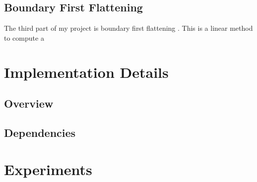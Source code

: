 \documentclass[fleqn,10pt]{wlscirep}
\begin{document}
\subsection{Boundary First Flattening}
The third part of my project is boundary first flattening \cite{1704.06873}. This is a linear method to compute a 






\section{Implementation Details}
\subsection{Overview}
\subsection{Dependencies}
\cite{eigenweb}\cite{libigl}\cite{LBFGSpp}\cite{Botsch02openmesh}


\section{Experiments}

 






\end{document}
